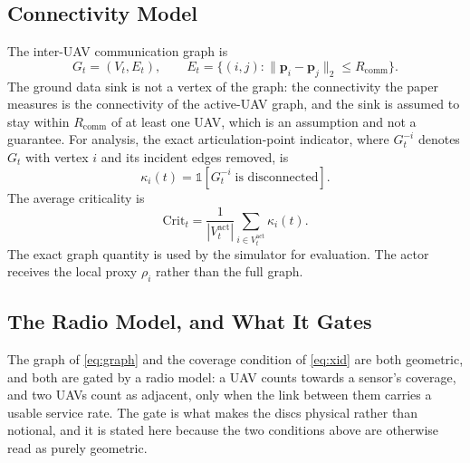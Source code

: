 \documentclass[conference]{IEEEtran}
\begin{document}
\subsection{Connectivity Model}
The inter-UAV communication graph is
\begin{equation}
G_t=(V_t,E_t),\qquad E_t=\{(i,j):\|\mathbf p_i-\mathbf p_j\|_2\le R_{\mathrm{comm}}\}.
\label{eq:graph}
\end{equation}
The ground data sink is not a vertex of the graph: the connectivity the paper measures is the connectivity of the active-UAV graph, and the sink is assumed to stay within $R_{\mathrm{comm}}$ of at least one UAV, which is an assumption and not a guarantee. For analysis, the exact articulation-point indicator, where $G_t^{-i}$ denotes $G_t$ with vertex $i$ and its incident edges removed, is
\begin{equation}
\kappa_i(t)=\mathbb 1\left[G_t^{-i}\;\text{is disconnected}\right].
\label{eq:articulation}
\end{equation}
The average criticality is
\begin{equation}
\mathrm{Crit}_t=\frac{1}{|V_t^{\mathrm{act}}|}\sum_{i\in V_t^{\mathrm{act}}}\kappa_i(t).
\label{eq:crit}
\end{equation}
The exact graph quantity is used by the simulator for evaluation. The actor receives the local proxy $\rho_i$ rather than the full graph.

\subsection{The Radio Model, and What It Gates}
\label{sec:radio}
The graph of \eqref{eq:graph} and the coverage condition of \eqref{eq:xid} are both geometric, and both are gated by a radio model: a UAV counts towards a sensor's coverage, and two UAVs count as adjacent, only when the link between them carries a usable service rate. The gate is what makes the discs physical rather than notional, and it is stated here because the two conditions above are otherwise read as purely geometric.
\end{document}
